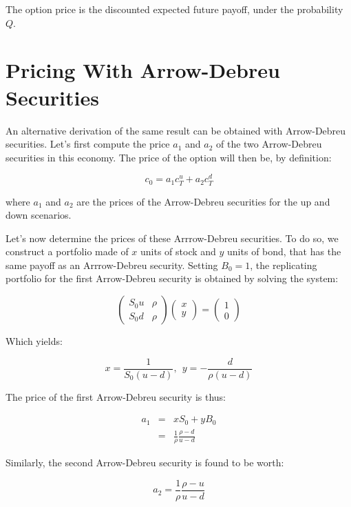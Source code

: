 \documentclass[justified]{tufte-book}
\begin{document}
The option price is the discounted expected future payoff, under the
probability \(Q\).

\hypertarget{pricing-with-arrow-debreu-securities}{%
\section{Pricing With Arrow-Debreu Securities}\label{pricing-with-arrow-debreu-securities}}

An alternative derivation of the same result can be obtained with
Arrow-Debreu securities. Let's first compute the price \(a_1\) and \(a_2\)
of the two Arrow-Debreu securities in this economy. The price of the
option will then be, by definition:

\[c_0 = a_1 c^u_T + a_2 c^d_T\]

where \(a_1\) and \(a_2\) are the prices of the Arrow-Debreu securities for
the up and down scenarios.

Let's now determine the prices of these Arrrow-Debreu securities. To do
so, we construct a portfolio made of \(x\) units of stock and \(y\) units of
bond, that has the same payoff as an Arrrow-Debreu security. Setting
\(B_0 = 1\), the replicating portfolio for the first Arrow-Debreu security
is obtained by solving the system:

\[\begin{pmatrix}
        S_0u & \rho \\
        S_0d & \rho
    \end{pmatrix}
    \begin{pmatrix}
        x \\
        y
    \end{pmatrix} =
    \begin{pmatrix}
        1 \\
        0
    \end{pmatrix}\]

Which yields:

\[x = \frac{1}{S_0(u-d)}, \  \ y = -\frac{d}{\rho(u-d)}\]

The price of the first Arrow-Debreu security is thus:

\[\begin{aligned}
    a_1 & = & x S_0 + y B_0 \\
        & = & \frac{1}{\rho} \frac{\rho-d}{u-d}\end{aligned}\]

Similarly, the second Arrow-Debreu security is found to be worth:

\[a_2 = \frac{1}{\rho} \frac{\rho-u}{u-d}\]
\end{document}

